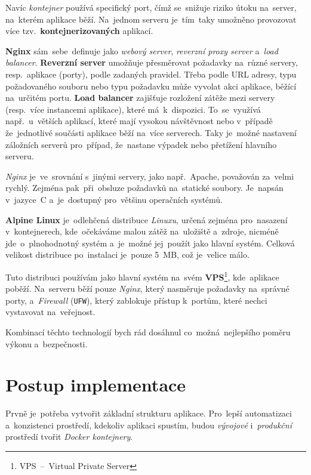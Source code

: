 \documentclass[11pt,a4paper]{report}
\begin{document}
            Navíc \emph{kontejner} používá specifický port, čímž se~snižuje riziko útoku na~server, na~kterém aplikace běží. Na~jednom serveru je~tím~taky umožněno provozovat více tzv.~\textbf{kontejnerizovaných} aplikací. \cite{docker, dockernginxperformance}

            \textbf{Nginx} sám~sebe~definuje jako \emph{webový server}, \emph{reverzní proxy server} a~\emph{load balancer}. \textbf{Reverzní server} umožňuje přesměrovat požadavky na~různé servery, resp.~aplikace (porty), podle zadaných pravidel. Třeba podle URL adresy, typu požadovaného souboru nebo typu požadavku může vyvolat akci aplikace, běžící na~určitém portu. \textbf{Load balancer} zajišťuje rozložení zátěže mezi servery (resp.~více instancemi aplikace), které má~k~dispozici. To~se~využívá např.~u~větších aplikací, které mají vysokou návštěvnost nebo v~případě že~jednotlivé součásti aplikace běží na~více serverech. Taky je~možné nastavení záložních serverů pro~případ, že~nastane výpadek nebo přetížení hlavního serveru.
            
            \emph{Nginx} je~ve~srovnání s~jinými servery, jako např.~Apache, považován za~velmi rychlý. Zejména pak~při~obsluze požadavků na~statické soubory. Je~napsán v~jazyce~C a~je~dostupný pro~většinu operačních systémů. \cite{WhatNGINX}

            \textbf{Alpine Linux} je~odlehčená distribuce \emph{Linuxu}, určená zejména pro~nasazení v~kontejnerech, kde~očekáváme malou zátěž na~uložiště a~zdroje, nicméně jde~o~plnohodnotný systém a~je~možné jej~použít jako hlavní systém. Celková velikost distribuce po~instalaci je~pouze 5~MB, což je~velice málo.

            Tuto distribuci používám jako hlavní systém na~svém \textbf{VPS}\footnote{VPS~--~Virtual Private Server}, kde~aplikace poběží. Na~serveru běží pouze \emph{Nginx}, který nasměruje požadavky na~správné porty, a~\emph{Firewall} (\texttt{UFW}), který zablokuje přístup k~portům, které nechci vystavovat na~veřejnost.

            Kombinací těchto technologií bych rád dosáhnul co~možná~nejlepšího poměru výkonu a~bezpečnosti.
	
	\chapter{Postup implementace}
        Prvně je~potřeba vytvořit základní strukturu aplikace. Pro~lepší automatizaci a~konzistenci prostředí, kdekoliv aplikaci spustím, budou \emph{vývojové} i~\emph{produkční} prostředí tvořit \emph{Docker kontejnery}.
\end{document}
